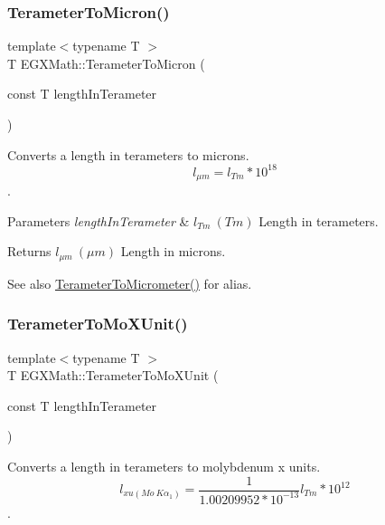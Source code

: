 \subsubsection{\texorpdfstring{Terameter\+To\+Micron()}{TerameterToMicron()}}
{\footnotesize\ttfamily template$<$typename T $>$ \\
T E\+G\+X\+Math\+::\+Terameter\+To\+Micron (\begin{DoxyParamCaption}\item[{const T}]{length\+In\+Terameter }\end{DoxyParamCaption})}



Converts a length in terameters to microns. \[ l_{\mu m}=l_{Tm} * 10^{18} \]. 


\begin{DoxyParams}{Parameters}
{\em length\+In\+Terameter} & $ l_{Tm}\ (Tm)$ Length in terameters. \\
\hline
\end{DoxyParams}
\begin{DoxyReturn}{Returns}
$ l_{\mu m}\ (\mu m)$ Length in microns. 
\end{DoxyReturn}
\begin{DoxySeeAlso}{See also}
\mbox{\hyperlink{group___e_g_x_math-_conversions-_length_conversions-_terameter-_s_i_ga4f6fb943e4c16178f4060c01a9c00a02}{Terameter\+To\+Micrometer()}} for alias. 
\end{DoxySeeAlso}
\mbox{\label{group___e_g_x_math-_conversions-_length_conversions-_terameter-_non-_s_i_ga391bcf9b529c2e20f2773c699bb0197a}} 
\subsubsection{\texorpdfstring{Terameter\+To\+Mo\+X\+Unit()}{TerameterToMoXUnit()}}
{\footnotesize\ttfamily template$<$typename T $>$ \\
T E\+G\+X\+Math\+::\+Terameter\+To\+Mo\+X\+Unit (\begin{DoxyParamCaption}\item[{const T}]{length\+In\+Terameter }\end{DoxyParamCaption})}



Converts a length in terameters to molybdenum x units. \[ l_{xu(Mo\ K\alpha_1)}=\frac{1}{1.00209952*10^{-13}} l_{Tm} * 10^{12}\]. 


